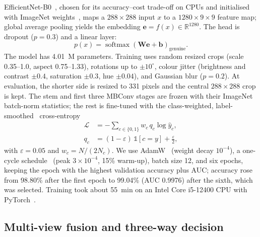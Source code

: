 \documentclass[pdflatex,iicol,sn-mathphys-num]{sn-jnl}
\begin{document}
EfficientNet-B0~\cite{tan2019efficientnet}, chosen for its accuracy--cost trade-off on
CPUs and initialised with ImageNet weights~\cite{deng2009imagenet}, maps a
$288\times288$ input $x$ to a $1280\times9\times9$ feature map; global average pooling
yields the embedding $\mathbf{e}=f(x)\in\mathbb{R}^{1280}$. The head is dropout
($p=0.3$) and a linear layer:
\begin{equation}
p(x) = \operatorname{softmax}\!\left(\mathbf{W}\mathbf{e}+\mathbf{b}\right)_{\text{genuine}} .
\label{eq:prob}
\end{equation}
The model has 4.01~M parameters. Training uses random resized crops (scale 0.35--1.0,
aspect 0.75--1.33), rotations up to $\pm10^\circ$, colour jitter (brightness and contrast
$\pm0.4$, saturation $\pm0.3$, hue $\pm0.04$), and Gaussian blur ($p=0.2$). At
evaluation, the shorter side is resized to 331 pixels and the central $288\times288$
crop is kept. The stem and first three MBConv stages are frozen with their ImageNet
batch-norm statistics; the rest is fine-tuned with the class-weighted,
label-smoothed~\cite{szegedy2016inception} cross-entropy
\begin{align}
\mathcal{L} &= -\sum_{c\in\{0,1\}} w_c\, q_c \log \hat{y}_c, \nonumber\\
q_c &= (1-\varepsilon)\,\mathbb{1}[c=y] + \tfrac{\varepsilon}{2},
\label{eq:loss}
\end{align}
with $\varepsilon=0.05$ and $w_c=N/(2N_c)$. We use AdamW~\cite{loshchilov2019adamw}
(weight decay $10^{-4}$), a one-cycle schedule~\cite{smith2019superconvergence} (peak
$3\times10^{-4}$, 15\% warm-up), batch size 12, and six epochs, keeping the epoch with
the highest validation accuracy plus AUC; accuracy rose from 98.80\% after the first
epoch to 99.04\% (AUC 0.9976) after the sixth, which was selected. Training took about
55~min on an Intel Core i5-12400 CPU with PyTorch~\cite{paszke2019pytorch}.

\subsection{Multi-view fusion and three-way decision}\label{sec:decision}
\end{document}
